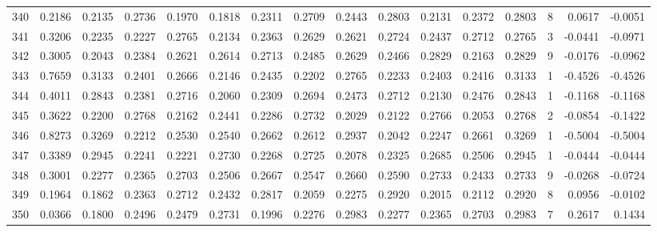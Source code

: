 \begin{tabular}{lrrrrrrrrrrrrrrr}
340 &      0.2186 &  0.2135 &  0.2736 &  0.1970 &  0.1818 &  0.2311 &  0.2709 &  0.2443 &  0.2803 &  0.2131 &   0.2372 &     0.2803 &      8 &                    0.0617 &                    -0.0051 \\
341 &      0.3206 &  0.2235 &  0.2227 &  0.2765 &  0.2134 &  0.2363 &  0.2629 &  0.2621 &  0.2724 &  0.2437 &   0.2712 &     0.2765 &      3 &                   -0.0441 &                    -0.0971 \\
342 &      0.3005 &  0.2043 &  0.2384 &  0.2621 &  0.2614 &  0.2713 &  0.2485 &  0.2629 &  0.2466 &  0.2829 &   0.2163 &     0.2829 &      9 &                   -0.0176 &                    -0.0962 \\
343 &      0.7659 &  0.3133 &  0.2401 &  0.2666 &  0.2146 &  0.2435 &  0.2202 &  0.2765 &  0.2233 &  0.2403 &   0.2416 &     0.3133 &      1 &                   -0.4526 &                    -0.4526 \\
344 &      0.4011 &  0.2843 &  0.2381 &  0.2716 &  0.2060 &  0.2309 &  0.2694 &  0.2473 &  0.2712 &  0.2130 &   0.2476 &     0.2843 &      1 &                   -0.1168 &                    -0.1168 \\
345 &      0.3622 &  0.2200 &  0.2768 &  0.2162 &  0.2441 &  0.2286 &  0.2732 &  0.2029 &  0.2122 &  0.2766 &   0.2053 &     0.2768 &      2 &                   -0.0854 &                    -0.1422 \\
346 &      0.8273 &  0.3269 &  0.2212 &  0.2530 &  0.2540 &  0.2662 &  0.2612 &  0.2937 &  0.2042 &  0.2247 &   0.2661 &     0.3269 &      1 &                   -0.5004 &                    -0.5004 \\
347 &      0.3389 &  0.2945 &  0.2241 &  0.2221 &  0.2730 &  0.2268 &  0.2725 &  0.2078 &  0.2325 &  0.2685 &   0.2506 &     0.2945 &      1 &                   -0.0444 &                    -0.0444 \\
348 &      0.3001 &  0.2277 &  0.2365 &  0.2703 &  0.2506 &  0.2667 &  0.2547 &  0.2660 &  0.2590 &  0.2733 &   0.2433 &     0.2733 &      9 &                   -0.0268 &                    -0.0724 \\
349 &      0.1964 &  0.1862 &  0.2363 &  0.2712 &  0.2432 &  0.2817 &  0.2059 &  0.2275 &  0.2920 &  0.2015 &   0.2112 &     0.2920 &      8 &                    0.0956 &                    -0.0102 \\
350 &      0.0366 &  0.1800 &  0.2496 &  0.2479 &  0.2731 &  0.1996 &  0.2276 &  0.2983 &  0.2277 &  0.2365 &   0.2703 &     0.2983 &      7 &                    0.2617 &                     0.1434 \\

\end{tabular}
